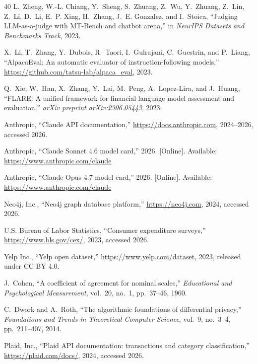\documentclass[conference]{IEEEtran}
\begin{document}
\begin{thebibliography}{40}
L.~Zheng, W.-L. Chiang, Y.~Sheng, S.~Zhuang, Z.~Wu, Y.~Zhuang,
Z.~Lin, Z.~Li, D.~Li, E.~P. Xing, H.~Zhang, J.~E. Gonzalez, and
I.~Stoica, ``Judging {LLM}-as-a-judge with {MT-Bench} and chatbot
arena,'' in \emph{NeurIPS Datasets and Benchmarks Track}, 2023.

X.~Li, T.~Zhang, Y.~Dubois, R.~Taori, I.~Gulrajani, C.~Guestrin,
and P.~Liang, ``{AlpacaEval}: An automatic evaluator of
instruction-following models,''
\url{https://github.com/tatsu-lab/alpaca_eval}, 2023.

Q.~Xie, W.~Han, X.~Zhang, Y.~Lai, M.~Peng, A.~Lopez-Lira, and
J.~Huang, ``{FLARE}: A unified framework for financial language
model assessment and evaluation,''
\emph{arXiv preprint arXiv:2306.05443}, 2023.

Anthropic, ``Claude API documentation,''
\url{https://docs.anthropic.com}, 2024--2026, accessed 2026.

Anthropic, ``{Claude Sonnet 4.6} model card,'' 2026.
[Online]. Available: \url{https://www.anthropic.com/claude}

Anthropic, ``{Claude Opus 4.7} model card,'' 2026.
[Online]. Available: \url{https://www.anthropic.com/claude}

Neo4j, Inc., ``Neo4j graph database platform,''
\url{https://neo4j.com}, 2024, accessed 2026.

U.S. Bureau of Labor Statistics, ``Consumer expenditure surveys,''
\url{https://www.bls.gov/cex/}, 2023, accessed 2026.

Yelp Inc., ``Yelp open dataset,''
\url{https://www.yelp.com/dataset}, 2023, released under CC BY 4.0.

J.~Cohen, ``A coefficient of agreement for nominal scales,''
\emph{Educational and Psychological Measurement}, vol.~20, no.~1,
pp.~37--46, 1960.

C.~Dwork and A.~Roth, ``The algorithmic foundations of differential
privacy,'' \emph{Foundations and Trends in Theoretical Computer
Science}, vol.~9, no.~3--4, pp.~211--407, 2014.

Plaid, Inc., ``Plaid API documentation: transactions and category
classification,'' \url{https://plaid.com/docs/}, 2024, accessed
2026.

\end{thebibliography}
\end{document}
